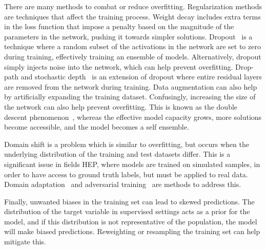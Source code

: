 There are many methods to combat or reduce overfitting.
Regularization methods are techniques that affect the training process.
Weight decay includes extra terms in the loss function that impose a penalty based on the magnitude of the parameters in the network, pushing it towards simpler solutions.
Dropout~\cite{Dropout} is a technique where a random subset of the activations in the network are set to zero during training, effectively training an ensemble of models.
Alternatively, dropout simply injects noise into the network, which can help prevent overfitting.
Drop-path and stochastic depth~\cite{DeepNetworksStochastic} is an extension of dropout where entire residual layers are removed from the network during training.
Data augmentation can also help by artificially expanding the training dataset.
Confusingly, increasing the size of the network can also help prevent overfitting.
This is known as the double descent phenomenon~\cite{UnderstandingDoubleDescent}, whereas the effective model capacity grows, more solutions become accessible, and the model becomes a self ensemble.

Domain shift is a problem which is similar to overfitting, but occurs when the underlying distribution of the training and test datasets differ.
This is a significant issue in fields HEP, where models are trained on simulated samples, in order to have access to ground truth labels, but must be applied to real data.
Domain adaptation~\cite{UnsupervisedDomainAdaptation} and adversarial training~\cite{EnhancingGeneralizationHigh} are methods to address this.

Finally, unwanted biases in the training set can lead to skewed predictions.
The distribution of the target variable in supervised settings acts as a prior for the model, and if this distribution is not representative of the population, the model will make biased predictions.
Reweighting or resampling the training set can help mitigate this.
